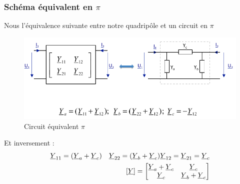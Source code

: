 \documentclass[12pt,a4paper]{article}
\newcommand{\uy}{\uline{Y} }
\begin{document}
\subsubsection{Schéma équivalent en $\pi$}
Nous l'équivalence suivante entre notre quadripôle et un circuit en $\pi$
\begin{figure}[!h]
	\centering
	\includegraphics[scale=0.7]{images/equiv_pi}
	\caption{Circuit équivalent $\pi$}
\end{figure}

Et inversement :
\begin{align}
	\uy_{11} = (\uy_a + \uy_c) \quad \uy_{22} = (\uy_b + \uy_c) \uy_{12} = \uy_{21} = \uy_c \\ 
	[\uy] = \begin{bmatrix}
		\uy_a + \uy_c & \uy_c\\
		\uy_c & \uy_b + \uy_c
	\end{bmatrix}
\end{align}
\end{document}
